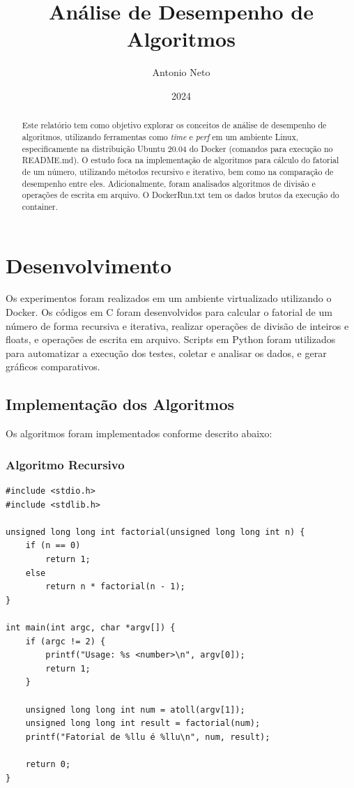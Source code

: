 \documentclass[12pt]{article}
\title{Análise de Desempenho de Algoritmos}
\author{Antonio Neto}
\date{2024}
\begin{document}
\maketitle

\begin{abstract}
Este relatório tem como objetivo explorar os conceitos de análise de desempenho de algoritmos, utilizando ferramentas como \textit{time} e \textit{perf} em um ambiente Linux, especificamente na distribuição Ubuntu 20.04 do Docker (comandos para execução no README.md). O estudo foca na implementação de algoritmos para cálculo do fatorial de um número, utilizando métodos recursivo e iterativo, bem como na comparação de desempenho entre eles. Adicionalmente, foram analisados algoritmos de divisão e operações de escrita em arquivo. O DockerRun.txt tem os dados brutos da execução do container.
\end{abstract}

\tableofcontents

\newpage

\section{Desenvolvimento}
Os experimentos foram realizados em um ambiente virtualizado utilizando o Docker. Os códigos em C foram desenvolvidos para calcular o fatorial de um número de forma recursiva e iterativa, realizar operações de divisão de inteiros e floats, e operações de escrita em arquivo. Scripts em Python foram utilizados para automatizar a execução dos testes, coletar e analisar os dados, e gerar gráficos comparativos.

\subsection{Implementação dos Algoritmos}
Os algoritmos foram implementados conforme descrito abaixo:

\subsubsection{Algoritmo Recursivo}
\begin{verbatim}
#include <stdio.h>
#include <stdlib.h>

unsigned long long int factorial(unsigned long long int n) {
    if (n == 0)
        return 1;
    else
        return n * factorial(n - 1);
}

int main(int argc, char *argv[]) {
    if (argc != 2) {
        printf("Usage: %s <number>\n", argv[0]);
        return 1;
    }

    unsigned long long int num = atoll(argv[1]);
    unsigned long long int result = factorial(num);
    printf("Fatorial de %llu é %llu\n", num, result);

    return 0;
}
\end{verbatim}
\newpage
\end{document}
